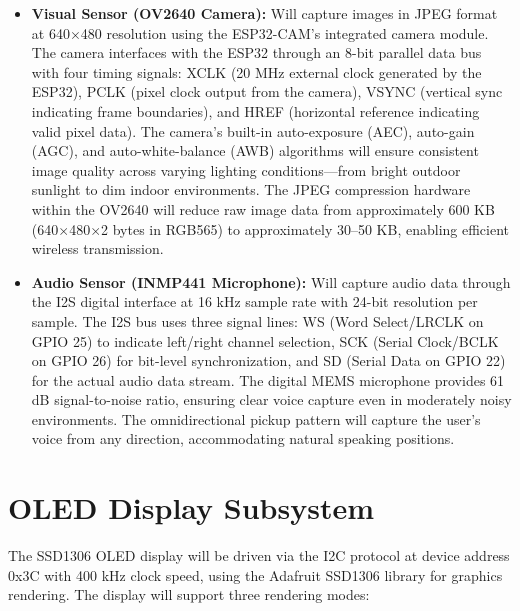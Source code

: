 \begin{itemize}[leftmargin=1.5cm]
\item \textbf{Visual Sensor (OV2640 Camera):} Will capture images in JPEG format at 640$\times$480 resolution using the ESP32-CAM's integrated camera module. The camera interfaces with the ESP32 through an 8-bit parallel data bus with four timing signals: XCLK (20 MHz external clock generated by the ESP32), PCLK (pixel clock output from the camera), VSYNC (vertical sync indicating frame boundaries), and HREF (horizontal reference indicating valid pixel data). The camera's built-in auto-exposure (AEC), auto-gain (AGC), and auto-white-balance (AWB) algorithms will ensure consistent image quality across varying lighting conditions---from bright outdoor sunlight to dim indoor environments. The JPEG compression hardware within the OV2640 will reduce raw image data from approximately 600 KB (640$\times$480$\times$2 bytes in RGB565) to approximately 30--50 KB, enabling efficient wireless transmission.

\item \textbf{Audio Sensor (INMP441 Microphone):} Will capture audio data through the I2S digital interface at 16 kHz sample rate with 24-bit resolution per sample. The I2S bus uses three signal lines: WS (Word Select/LRCLK on GPIO 25) to indicate left/right channel selection, SCK (Serial Clock/BCLK on GPIO 26) for bit-level synchronization, and SD (Serial Data on GPIO 22) for the actual audio data stream. The digital MEMS microphone provides 61 dB signal-to-noise ratio, ensuring clear voice capture even in moderately noisy environments. The omnidirectional pickup pattern will capture the user's voice from any direction, accommodating natural speaking positions.
\end{itemize}

\section{OLED Display Subsystem}
The SSD1306 OLED display will be driven via the I2C protocol at device address 0x3C with 400 kHz clock speed, using the Adafruit SSD1306 library for graphics rendering. The display will support three rendering modes:

